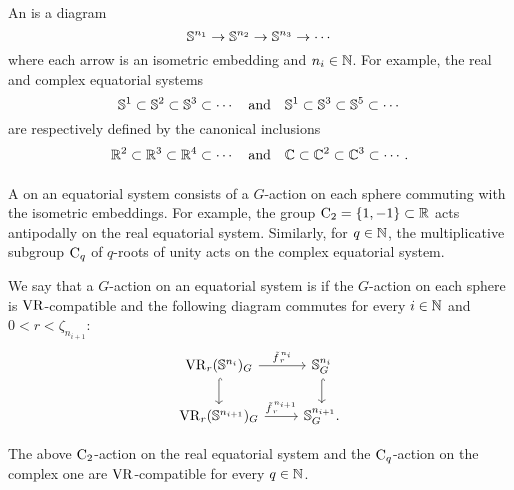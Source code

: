 \subsubsection{}
\label{subsub:VR-compatible-system}
An  is a diagram
\[
\mathbb{S}^{n_1} \to \mathbb{S}^{n_2} \to \mathbb{S}^{n_3} \to \dotsb
\]
where each arrow is an isometric embedding and $n_i \in \mathbb{N}$.
For example, the real and complex equatorial systems
\[
\mathbb{S}^1 \subset \mathbb{S}^2 \subset \mathbb{S}^3 \subset \dotsb
\quad\text{and}\quad
\mathbb{S}^1 \subset \mathbb{S}^3 \subset \mathbb{S}^5 \subset \dotsb
\]
are respectively defined by the canonical inclusions
\[
\mathbb{R}^2 \subset \mathbb{R}^3 \subset \mathbb{R}^4 \subset \dotsb
\quad\text{and}\quad
\mathbb{C} \subset \mathbb{C}^2 \subset \mathbb{C}^3 \subset \dotsb.
\]

\subsubsection{}
\label{subsub:system VR compatible}

A  on an equatorial system consists of a \(G\)-action on each sphere commuting with the isometric embeddings.
For example, the group \(\mathrm{C}_2 = \{1,-1\} \subset \mathbb{R}\) acts antipodally on the real equatorial system.
Similarly, for \(q \in \mathbb{N}\), the multiplicative subgroup \(\mathrm{C}_q\) of \(q\)-roots of unity acts on the complex equatorial system.

We say that a \(G\)-action on an equatorial system is  if the \(G\)-action on each sphere is \(\mathrm{VR}\)-compatible and the following diagram commutes for every \(i \in \mathbb{N}\) and $0 < r < \zeta_{n_{i+1}}$:
\begin{equation}\label{eq:VR_quotient}
    \begin{tikzcd}
	\VR_r(\bS^{n_i})_G
	\ar[d, hook]
	\ar[r, "\tilde f_{\,r}^{\,n_i}" above]
	&
	\bS^{n_i}_G
	\ar[d, hook]
	\\
	\VR_r(\bS^{n_{i+1}})_G
	\ar[r, "\tilde f_{\,r}^{\,n_{i+1}}" above]
	&
	\bS^{n_{i+1}}_G.
\end{tikzcd}
\end{equation}



\lemma The above \(\mathrm{C}_2\)-action on the real equatorial system and the \(\mathrm{C}_q\)-action on the complex one are \(\mathrm{VR}\)-compatible for every \(q \in \mathbb{N}\).

